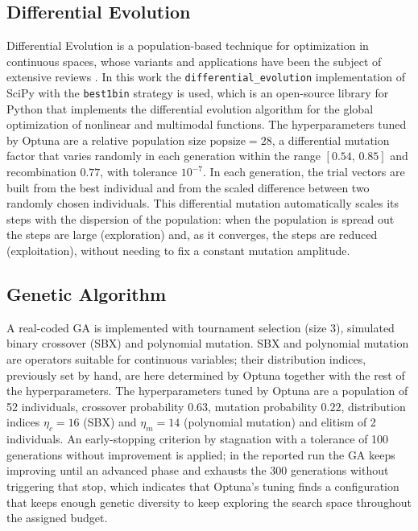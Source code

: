 \documentclass[conference]{IEEEtran}
\begin{document}
\subsection{Differential Evolution}
Differential Evolution is a population-based technique for optimization in
continuous spaces, whose variants and applications have been the subject of
extensive reviews \cite{ref_de_recent,ref_de_image}. In this work the
\texttt{differential\_evolution} implementation of SciPy with the
\texttt{best1bin} strategy is used, which is an open-source library for Python
that implements the differential evolution algorithm for the global optimization
of nonlinear and multimodal functions. The hyperparameters tuned by Optuna are a
relative population size $\text{popsize}=28$, a differential mutation factor that
varies randomly in each generation within the range $[0.54,\,0.85]$ and
recombination $0.77$, with tolerance $10^{-7}$. In each generation, the trial
vectors are built from the best individual and from the scaled difference between
two randomly chosen individuals. This differential mutation automatically scales
its steps with the dispersion of the population: when the population is spread out
the steps are large (exploration) and, as it converges, the steps are reduced
(exploitation), without needing to fix a constant mutation amplitude.

\subsection{Genetic Algorithm}
A real-coded GA is implemented with tournament selection (size 3), simulated
binary crossover (SBX) \cite{ref_sbx} and polynomial mutation. SBX and polynomial
mutation are operators suitable for continuous variables; their distribution
indices, previously set by hand, are here determined by Optuna together with the
rest of the hyperparameters. The hyperparameters tuned by Optuna are a population
of 52 individuals, crossover probability $0.63$, mutation probability $0.22$,
distribution indices $\eta_c=16$ (SBX) and $\eta_m=14$ (polynomial mutation) and
elitism of 2 individuals. An early-stopping criterion by stagnation with a
tolerance of 100 generations without improvement is applied; in the reported run
the GA keeps improving until an advanced phase and exhausts the 300 generations
without triggering that stop, which indicates that Optuna's tuning finds a
configuration that keeps enough genetic diversity to keep exploring the search
space throughout the assigned budget.
\end{document}
